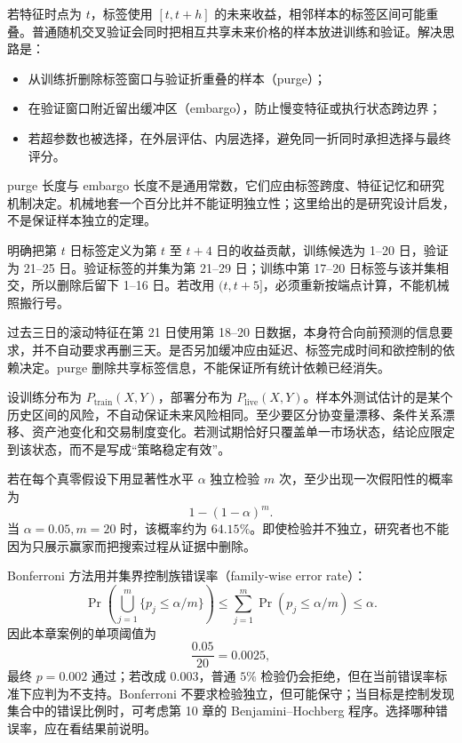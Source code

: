 
若特征时点为 $t$，标签使用 $[t,t+h]$ 的未来收益，相邻样本的标签区间可能重叠。普通随机交叉验证会同时把相互共享未来价格的样本放进训练和验证。解决思路是：
\begin{itemize}[leftmargin=*]
  \item 从训练折删除标签窗口与验证折重叠的样本（purge）；
  \item 在验证窗口附近留出缓冲区（embargo），防止慢变特征或执行状态跨边界；
  \item 若超参数也被选择，在外层评估、内层选择，避免同一折同时承担选择与最终评分。
\end{itemize}


\begin{heuristic}
purge 长度与 embargo 长度不是通用常数，它们应由标签跨度、特征记忆和研究机制决定。机械地套一个百分比并不能证明独立性；这里给出的是研究设计启发，不是保证样本独立的定理。
\end{heuristic}

\begin{example}[一张可复核的时间窗口表]
明确把第 $t$ 日标签定义为第 $t$ 至 $t+4$ 日的收益贡献，训练候选为 1--20 日，验证为 21--25 日。验证标签的并集为第 21--29 日；训练中第 17--20 日标签与该并集相交，所以删除后留下 1--16 日。若改用 $(t,t+5]$，必须重新按端点计算，不能机械照搬行号。

过去三日的滚动特征在第 21 日使用第 18--20 日数据，本身符合向前预测的信息要求，并不自动要求再删三天。是否另加缓冲应由延迟、标签完成时间和欲控制的依赖决定。purge 删除共享标签信息，不能保证所有统计依赖已经消失。

\end{example}


设训练分布为 $P_{\mathrm{train}}(X,Y)$，部署分布为 $P_{\mathrm{live}}(X,Y)$。样本外测试估计的是某个历史区间的风险，不自动保证未来风险相同。至少要区分协变量漂移、条件关系漂移、资产池变化和交易制度变化。若测试期恰好只覆盖单一市场状态，结论应限定到该状态，而不是写成“策略稳定有效”。


若在每个真零假设下用显著性水平 $\alpha$ 独立检验 $m$ 次，至少出现一次假阳性的概率为
\[
  1-(1-\alpha)^m.
\]
当 $\alpha=0.05,m=20$ 时，该概率约为 $64.15\%$。即使检验并不独立，研究者也不能因为只展示赢家而把搜索过程从证据中删除。

Bonferroni 方法用并集界控制族错误率（family-wise error rate）：
\[
  \Pr\left(\bigcup_{j=1}^m\{p_j\le\alpha/m\}\right)
  \le \sum_{j=1}^m \Pr(p_j\le\alpha/m)\le\alpha.
\]
因此本章案例的单项阈值为
\[
  \frac{0.05}{20}=0.0025,
\]
最终 $p=0.002$ 通过；若改成 $0.003$，普通 $5\%$ 检验仍会拒绝，但在当前错误率标准下应判为不支持。Bonferroni 不要求检验独立，但可能保守；当目标是控制发现集合中的错误比例时，可考虑第 10 章的 Benjamini--Hochberg 程序。选择哪种错误率，应在看结果前说明。

